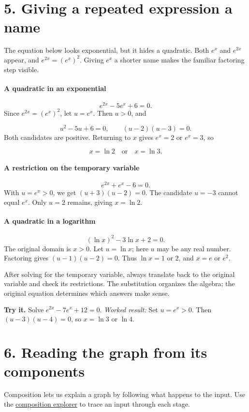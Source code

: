 \documentclass[11pt,letterpaper]{article}
\begin{document}
\section*{5. Giving a repeated expression a name}
The equation below looks exponential, but it hides a quadratic. Both \(e^x\) and \(e^{2x}\) appear, and \(e^{2x}=(e^x)^2\). Giving \(e^x\) a shorter name makes the familiar factoring step visible.


\paragraph{A quadratic in an exponential} \[e^{2x}-5e^x+6=0.\]Since \(e^{2x}=(e^x)^2\), let \(u=e^x\). Then \(u>0\), and

\[u^2-5u+6=0,\qquad(u-2)(u-3)=0.\]Both candidates are positive. Returning to \(x\) gives \(e^x=2\) or \(e^x=3\), so

\[x=\ln2\quad\text{or}\quad x=\ln3.\]


\paragraph{A restriction on the temporary variable} \[e^{2x}+e^x-6=0.\]With \(u=e^x>0\), we get \((u+3)(u-2)=0\). The candidate \(u=-3\) cannot equal \(e^x\). Only \(u=2\) remains, giving \(x=\ln2\).




\paragraph{A quadratic in a logarithm} \[(\ln x)^2-3\ln x+2=0.\]The original domain is \(x>0\). Let \(u=\ln x\); here \(u\) may be any real number. Factoring gives \((u-1)(u-2)=0\). Thus \(\ln x=1\) or \(2\), and \(x=e\) or \(e^2\).



After solving for the temporary variable, always translate back to the original variable and check its restrictions. The substitution organizes the algebra; the original equation determines which answers make sense.

\textbf{Try it.} Solve \(e^{2x}-7e^x+12=0\).
\textit{Worked result:} Set \(u=e^x>0\). Then \((u-3)(u-4)=0\), so \(x=\ln3\) or \(\ln4\).







\section*{6. Reading the graph from its components}
Composition lets us explain a graph by following what happens to the input. Use the \href{https://bobovski66.github.io/Precalculus/demos/function_composition.html}{composition explorer} to trace an input through each stage.
\end{document}
